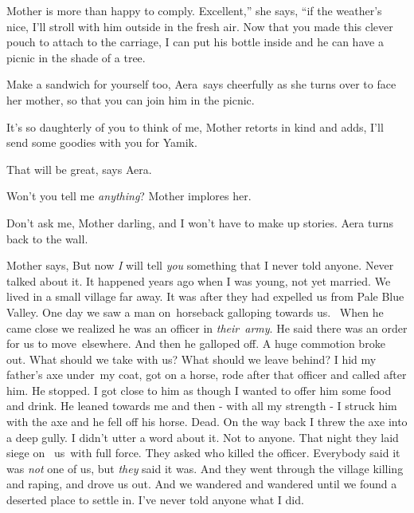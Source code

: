 \documentclass[twoside,11pt]{book}
\begin{document}
Mother is more than happy to comply. {\textquotedbl}Excellent,'' she says, ``if the weather's nice, I'll stroll with him
outside in the fresh air. Now that you made this clever pouch to attach to the carriage, I can put his bottle inside
and he can have a picnic in the shade of a tree.{\textquotedbl}

{\textquotedbl}Make a sandwich for yourself too,{\textquotedbl} Aera\ says cheerfully as she turns over to face her
mother, {\textquotedbl}so that you can join him in the picnic.{\textquotedbl} 

{\textquotedbl}It's so daughterly of you to think of me,{\textquotedbl} Mother retorts in kind and adds,
{\textquotedbl}I'll send some goodies with you for Yamik.{\textquotedbl}

{\textquotedbl}That will be great,{\textquotedbl} says Aera.

{\textquotedbl}Won't you tell me \textit{anything}?{\textquotedbl} Mother implores her. 

{\textquotedbl}Don't ask me, Mother darling, {\textquotedbl}and I won't have to make up stories.{\textquotedbl} Aera
turns back to the wall.\ 

Mother says, {\textquotedbl}But now \textit{I }will tell \textit{you} something that I never told anyone. Never talked
about it. It happened years ago when I was young, not yet married. We lived in a small village far away. It was after
they had expelled us from Pale Blue Valley. One day we saw a man on~horseback galloping towards us. ~When he came close
we realized he was an officer in \textit{their}\ \textit{army}. He said there was an order for us to move~elsewhere.
And then he galloped off. A huge commotion broke out. What should we take with us? What should we leave behind? I hid
my father's axe under~my coat, got on a horse, rode after that officer and called after him. He stopped. I got close to
him as though I wanted to offer him some food and drink. He leaned towards me and then {}- with all my strength -  I
struck him with the axe and he fell off his horse. Dead. On the way back I threw the axe into a deep gully. I didn't
utter a word about it. Not to anyone. That night they laid siege on \ us\ with full force. They asked who killed the
officer. Everybody said it was \textit{not} one of us, but \textit{they} said it was. And they went through the village
killing and raping, and drove us out. And we wandered and wandered until we found a deserted place to settle in. I've
never told anyone what I did.{\textquotedbl}\ 
\end{document}
